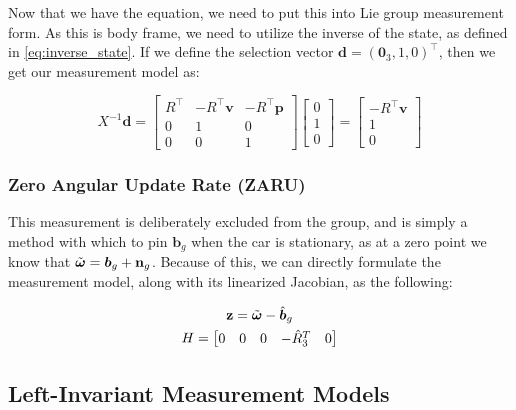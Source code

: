 Now that we have the equation, we need to put this into Lie group measurement form. As this is body frame, we need to utilize the inverse of the state, as defined in \eqref{eq:inverse_state}. If we define the selection vector $\mathbf{d}=(\mathbf{0}_3,1,0)^\top$, then we get our measurement model as:

\begin{equation}
  X^{-1}\mathbf{d} =
  \begin{bmatrix}
    R^\top & -R^\top \mathbf{v} & -R^\top \mathbf{p} \\
    0 & 1 & 0 \\
    0 & 0 & 1
  \end{bmatrix}
  \begin{bmatrix}
    0 \\ 1 \\ 0
  \end{bmatrix}
  = \begin{bmatrix}
    -R^\top\mathbf{v} \\ 1 \\ 0
  \end{bmatrix}
  \label{eq:axle_meas}
\end{equation}

\subsubsection{Zero Angular Update Rate (ZARU)}

This measurement is deliberately excluded from the group, and is simply a method with which to pin $\mathbf{b}_g$ when the car is stationary, as at a zero point we know that $\tilde{\boldsymbol{\omega}} = \boldsymbol{b}_g + \mathbf{n}_g$. Because of this, we can directly formulate the measurement model, along with its linearized Jacobian, as the following:

\begin{equation}
  \begin{gathered}
    \mathbf{z} = \tilde{\boldsymbol{\omega}} - \hat{\boldsymbol{b}}_g \\
    H = \begin{bmatrix} 0 & 0 & 0 & -\hat R^T_3 & 0 \end{bmatrix}
  \end{gathered}
  \label{eq:}
\end{equation}

\subsection{Left-Invariant Measurement Models}


